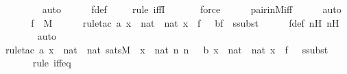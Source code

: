 \begin{isabellebody}
\ \ \ \ \ \ \isamarkupfalse%
\ auto{\isacharbrackleft}{\kern0pt}{}{\isacharbrackright}{\kern0pt}\isanewline
\ \ \ \ \isamarkupfalse%
\ f{\isacharunderscore}{\kern0pt}def\isanewline
\ \ \ \ \isamarkupfalse%
{\isacharparenleft}{\kern0pt}rule\ iffI{\isacharparenright}{\kern0pt}\isanewline
\ \ \ \ \ \isamarkupfalse%
\ force\isanewline
\ \ \ \ \isamarkupfalse%
\ pair{\isacharunderscore}{\kern0pt}in{\isacharunderscore}{\kern0pt}M{\isacharunderscore}{\kern0pt}iff\isanewline
\ \ \ \ \isamarkupfalse%
\ auto\isanewline
\ \ \isamarkupfalse%
\ \isamarkupfalse%
\ {\isachardoublequoteopen}f\ {\isasymin}\ M{\isachardoublequoteclose}\ \isanewline
\ \ \ \ \isamarkupfalse%
{\isacharparenleft}{\kern0pt}rule{\isacharunderscore}{\kern0pt}tac\ a{\isacharequal}{\kern0pt}{\isachardoublequoteopen}{\isacharbraceleft}{\kern0pt}\ x\ {\isasymin}\ nat\ {\isasymtimes}\ nat{\isachardot}{\kern0pt}\ x\ {\isasymin}\ f\ {\isacharbraceright}{\kern0pt}{\isachardoublequoteclose}\ \ b{\isacharequal}{\kern0pt}f\ \ ssubst{\isacharparenright}{\kern0pt}\isanewline
\ \ \ \ \isamarkupfalse%
\ f{\isacharunderscore}{\kern0pt}def\ nH\ n{\isacharprime}{\kern0pt}H\isanewline
\ \ \ \ \ \isamarkupfalse%
\ auto{\isacharbrackleft}{\kern0pt}{}{\isacharbrackright}{\kern0pt}\isanewline
\ \ \ \ \isamarkupfalse%
{\isacharparenleft}{\kern0pt}rule{\isacharunderscore}{\kern0pt}tac\ a{\isacharequal}{\kern0pt}{\isachardoublequoteopen}{\isacharbraceleft}{\kern0pt}\ x\ {\isasymin}\ nat\ {\isasymtimes}\ nat{\isachardot}{\kern0pt}\ sats{\isacharparenleft}{\kern0pt}M{\isacharcomma}{\kern0pt}\ {\isasympsi}{\isacharcomma}{\kern0pt}\ {\isacharbrackleft}{\kern0pt}x{\isacharbrackright}{\kern0pt}\ {\isacharat}{\kern0pt}\ {\isacharbrackleft}{\kern0pt}nat{\isacharcomma}{\kern0pt}\ n{\isacharcomma}{\kern0pt}\ n{\isacharprime}{\kern0pt}{\isacharbrackright}{\kern0pt}{\isacharparenright}{\kern0pt}\ {\isacharbraceright}{\kern0pt}{\isachardoublequoteclose}\ \ b{\isacharequal}{\kern0pt}{\isachardoublequoteopen}{\isacharbraceleft}{\kern0pt}\ x\ {\isasymin}\ nat\ {\isasymtimes}\ nat{\isachardot}{\kern0pt}\ x\ {\isasymin}\ f\ {\isacharbraceright}{\kern0pt}{\isachardoublequoteclose}\ \ ssubst{\isacharparenright}{\kern0pt}\isanewline
\ \ \ \ \ \isamarkupfalse%
{\isacharparenleft}{\kern0pt}rule\ iff{\isacharunderscore}{\kern0pt}eq{\isacharparenright}{\kern0pt}\isanewline

\end{isabellebody}
